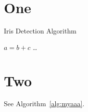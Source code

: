 \documentclass[a4paper]{book}
\begin{document}
\tableofcontents

\chapter{One}

\begin{algorithm}
\caption{Iris Detection Algorithm}\label{alg:myaaa}
\begin{algorithmic}[1]
   \State $a=b+c$
   \State \ldots
   \EndIf
\end{algorithmic}
\end{algorithm}

\chapter{Two}

See Algorithm~\ref{alg:myaaa}.
\end{document}
